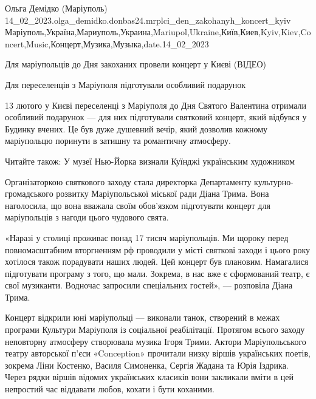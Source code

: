  
 
 
 
 

Ольга Демідко (Маріуполь)
14_02_2023.olga_demidko.donbas24.mrplci_den_zakohanyh_koncert_kyiv
Маріуполь,Україна,Мариуполь,Украина,Mariupol,Ukraine,Київ,Киев,Kyiv,Kiev,Concert,Music,Концерт,Музика,Музыка,date.14_02_2023

Для маріупольців до Дня закоханих провели концерт у Києві (ВІДЕО)

Для переселенців з Маріуполя підготували особливий подарунок

13 лютого у Києві переселенці з Маріуполя до Дня Святого Валентина отримали
особливий подарунок — для них підготували святковий концерт, який відбувся у
Будинку вчених. Це був дуже душевний вечір, який дозволив кожному маріупольцю
поринути в затишну та романтичну атмосферу.

Читайте також: У музеї Нью-Йорка визнали Куїнджі українським художником

Організаторкою святкового заходу стала директорка Департаменту
культурно-громадського розвитку Маріупольської міської ради Діана Трима. Вона
наголосила, що вона вважала своїм обов'язком підготувати концерт для
маріупольців з нагоди цього чудового свята.

«Наразі у столиці проживає понад 17 тисяч маріупольців. Ми щороку перед
повномасштабним вторгненням рф проводили у місті святкові заходи і цього року
хотілося також порадувати наших людей. Цей концерт був плановим. Намагалися
підготувати програму з того, що мали. Зокрема, в нас вже є сформований театр,
є свої музиканти. Водночас запросили спеціальних гостей», — розповіла Діана
Трима.

Концерт відкрили юні маріупольці — виконали танок, створений в межах програми
Культури Маріуполя із соціальної реабілітації. Протягом всього заходу
неповторну атмосферу створювала музика Ігоря Трими. Актори Маріупольського
театру авторської п'єси «Conception» прочитали низку віршів українських поетів,
зокрема Ліни Костенко, Василя Симоненка, Сергія Жадана та Юрія Іздрика. Через
рядки віршів відомих українських класиків вони закликали вміти в цей непростий
час віддавати любов, кохати і бути коханими.

